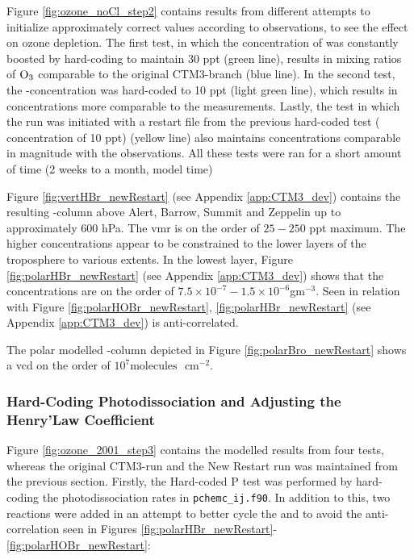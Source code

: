 \medskip

Figure \ref{fig:ozone_noCl_step2} contains results from different attempts to initialize  approximately correct values according to observations, to see the effect on ozone depletion. The first test, in which the concentration of  was constantly boosted by hard-coding to maintain 30 ppt (green line), results in mixing ratios of $\mathrm{O_3}$ comparable to the original CTM3-branch (blue line). In the second test, the -concentration was hard-coded to 10 ppt (light green line), which results in concentrations more comparable to the measurements. Lastly, the test in which the run was initiated with a restart file from the previous hard-coded test ( concentration of 10 ppt) (yellow line) also maintains concentrations comparable in magnitude with the observations. All these tests were ran for a short amount of time (2 weeks to a month, model time)



\medskip

Figure \ref{fig:vertHBr_newRestart} (see Appendix \ref{app:CTM3_dev}) contains the resulting -column above Alert, Barrow, Summit and Zeppelin up to approximately $600$ hPa. The \acrshort{vmr} is on the order of $25 - 250$ ppt maximum. The higher concentrations appear to be constrained to the lower layers of the troposphere to various extents. In the lowest layer, Figure \ref{fig:polarHBr_newRestart} (see Appendix \ref{app:CTM3_dev}) shows that the concentrations are on the order of $7.5\times10^{-7} - 1.5\times10^{-6}$gm$^{-3}$. Seen in relation with Figure \ref{fig:polarHOBr_newRestart}, \ref{fig:polarHBr_newRestart} (see Appendix \ref{app:CTM3_dev}) is anti-correlated. 

\medskip

The polar modelled -column depicted in Figure \ref{fig:polarBro_newRestart} shows a \acrshort{vcd} on the order of $10^7 \text{molecules }$ cm$^{-2}$. 

\clearpage
\subsubsection{Hard-Coding Photodissociation and Adjusting the Henry'Law Coefficient}\label{sec:res_step3}

Figure \ref{fig:ozone_2001_step3} contains the modelled results from four tests, whereas the original CTM3-run and the New Restart run was maintained from the previous section. Firstly, the Hard-coded P test was performed by hard-coding the photodissociation rates in \texttt{pchemc\_ij.f90}. In addition to this, two reactions were added in an attempt to better cycle the  and  to avoid the anti-correlation seen in Figures \ref{fig:polarHBr_newRestart}-\ref{fig:polarHOBr_newRestart}:  

